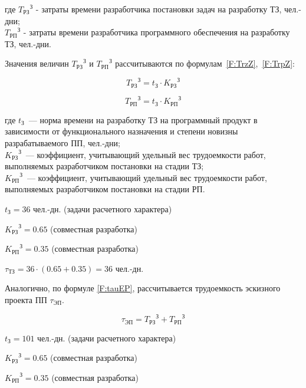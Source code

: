 где ${T_{\text{РЗ}}}^\text{З}$ - затраты времени разработчика постановки задач на разработку ТЗ, чел.-дни; \\ ${T_{\text{РП}}}^\text{З}$ - затраты времени разработчика программного обеспечения на разработку ТЗ, чел.-дни.

Значения величин ${T_{\text{РЗ}}}^\text{З}$ и ${T_{\text{РП}}}^\text{З}$ рассчитываются по формулам~\ref{F:TrzZ},~\ref{F:TrpZ}:

\begin{equation}
{T_{\text{РЗ}}}^\text{З} = t_\text{З} \cdot {K_{\text{РЗ}}}^\text{З}
\label{F:TrzZ}
\end{equation}

\begin{equation}
{T_{\text{РП}}}^\text{З} = t_\text{З} \cdot {K_{\text{РП}}}^\text{З}
\label{F:TrpZ}
\end{equation}

где $t_\text{З}$~--- норма времени на разработку ТЗ на программный продукт в зависимости от функционального назначения и степени новизны разрабатываемого ПП, чел.-дни; \\ ${K_{\text{РЗ}}}^\text{З}$~--- коэффициент, учитывающий удельный вес трудоемкости работ, выполняемых разработчиком постановки на стадии ТЗ; \\ ${K_{\text{РП}}}^\text{З}$~--- коэффициент, учитывающий удельный вес трудоемкости работ, выполняемых разработчиком постановки на стадии РП.

$t_{\text{З}} = 36$ чел.-дн. (задачи расчетного характера)

${K_{\text{РЗ}}}^\text{З} = 0.65$ (совместная разработка)

${K_{\text{РП}}}^\text{З} = 0.35$ (совместная разработка)

$\tau_{\text{ТЗ}} = 36 \cdot (0.65 + 0.35) = 36 $ чел.-дн.

Аналогично, по формуле \ref{F:tauEP}, рассчитывается трудоемкость эскизного проекта ПП $\tau_{\text{ЭП}}$.

\begin{equation}
\tau_{\text{ЭП}} = {T_{\text{РЗ}}}^\text{З} + {T_{\text{РП}}}^\text{З}
\label{F:tauEP}
\end{equation}

$t_{\text{З}} = 101$ чел.-дн. (задачи расчетного характера)

${K_{\text{РЗ}}}^\text{З} = 0.65$ (совместная разработка)

${K_{\text{РП}}}^\text{З} = 0.35$ (совместная разработка)

